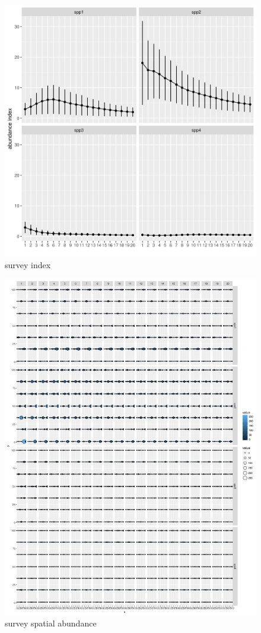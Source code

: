 \documentclass[review]{elsarticle}
\begin{document}
\begin{figure}[!ht]
	\includegraphics[width = \linewidth]{../tests/plots/survey_index}
	\caption{survey index}
	\label{fig:10}
\end{figure}	

\begin{figure}[!ht]
	\includegraphics[width = \linewidth]{../tests/plots/spatial_survey}
	\caption{survey spatial abundance}
	\label{fig:11}
\end{figure}	
\end{document}
